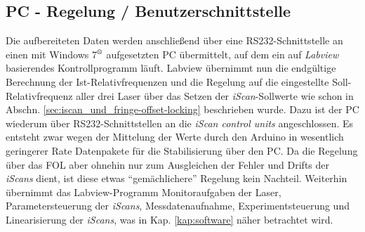 \subsection{PC - Regelung /
Benutzerschnittstelle}\label{subsec:pc_regelung_benutzerschnittstelle} Die
aufbereiteten Daten werden anschließend über eine RS232-Schnittstelle an einen mit Windows
7$^\text{\textregistered}$ aufgesetzten PC übermittelt, auf dem ein auf
\textit{Labview} basierendes Kontrollprogramm läuft. Labview übernimmt nun die endgültige Berechnung der
Ist-Relativfrequenzen und die Regelung auf die eingestellte Soll-Relativfrequenz
aller drei Laser über das Setzen der \textit{iScan}-Sollwerte wie schon in
Abschn.
\ref{sec:iscan_und_fringe-offset-locking} beschrieben wurde.
Dazu ist der PC wiederum über RS232-Schnittstellen an die \textit{iScan control
units} angeschlossen. Es entsteht zwar wegen der Mittelung der Werte durch den
Arduino in wesentlich geringerer Rate Datenpakete für die Stabilisierung über den PC. Da
die Regelung über das FOL aber ohnehin nur zum Ausgleichen der Fehler und Drifts
der \textit{iScans} dient, ist diese etwas "`gemächlichere"' Regelung kein
Nachteil.
Weiterhin übernimmt das Labview-Programm Monitoraufgaben der Laser,
Parametersteuerung der \textit{iScans}, Messdatenaufnahme, Experimentsteuerung
und Linearisierung der \textit{iScans}, was in Kap. \ref{kap:software} näher
betrachtet wird.\par

